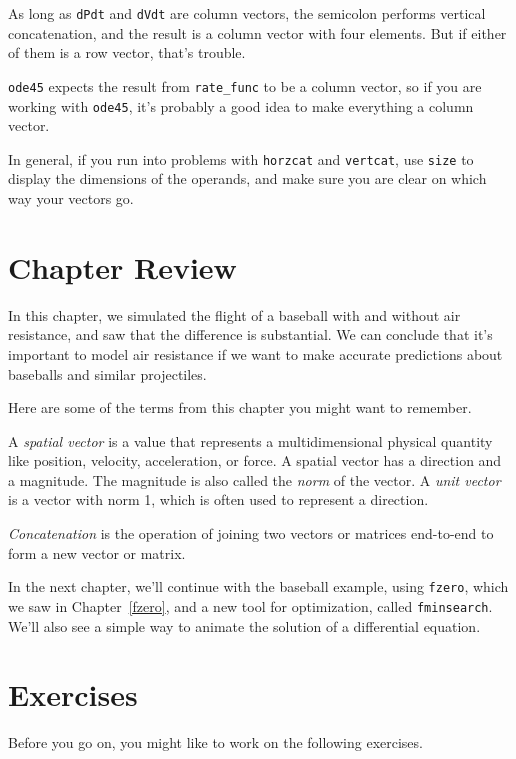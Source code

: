 As long as \lstinline{dPdt} and \lstinline{dVdt} are column vectors,
the semicolon performs vertical concatenation, and the result is
a column vector with four elements.  But if either of them is a
row vector, that's trouble.


\lstinline{ode45} expects the result from \lstinline{rate_func} to be a
column vector, so if you are working with \lstinline{ode45}, it's
probably a good idea to make everything a column vector.

In general, if you run into problems with \lstinline{horzcat} and
\lstinline{vertcat}, use \lstinline{size} to display the dimensions of the operands,
and make sure you are clear on which way your vectors go.

\section{Chapter Review}

In this chapter, we simulated the flight of a baseball with and without air resistance, and saw that the difference is substantial.
We can conclude that it's important to model air resistance if we want to make accurate predictions about baseballs and similar projectiles.

Here are some of the terms from this chapter you might want to remember.

A \emph{spatial vector} is a value that represents a multidimensional physical quantity like position, velocity, acceleration, or force.
A spatial vector has a direction and a magnitude.  The magnitude is also called the \emph{norm} of the vector.
A \emph{unit vector} is a vector with norm 1, which is often used to represent a
direction.

\emph{Concatenation} is the operation of joining two vectors or matrices end-to-end to
form a new vector or matrix.

In the next chapter, we'll continue with the baseball example, using \lstinline{fzero}, which we saw in Chapter~\ref{fzero}, and a new tool for optimization, called \lstinline{fminsearch}.  We'll also see a simple way to animate the solution of a differential equation.


\section{Exercises}

Before you go on, you might like to work on the following exercises.

